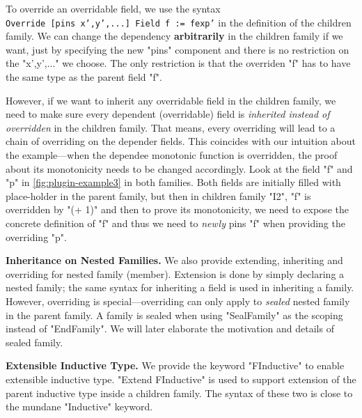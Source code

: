 To override an overridable field, we use the syntax \\ \texttt{Override [pins {x',y',...}] Field f := fexp'} in the definition of the children family. We can change the dependency \textbf{arbitrarily} in the children family if we want, just by specifying the new "pins" component and there is no restriction on the "x',y',..." we choose. The only restriction is that the overriden "f" has to have the same type as the parent field "f". 

However, if we want to inherit any overridable field in the children family, we need to make sure every dependent (overridable) field is \textit{inherited instead of overridden} in the children family. That means, every overriding will lead to a chain of overriding on the depender fields. This coincides with our intuition about the example---when the dependee monotonic function is overridden, the proof about its monotonicity needs to be changed accordingly. 
Look at the field "f" and "p" in \cref{fig:plugin-example3} in both families. Both fields are initially filled with place-holder in the parent family, but then in children family "I2", "f" is overridden by "(+ 1)" and then to prove its monotonicity, we need to expose the concrete definition of "f" and thus we need to \textit{newly} pins "f" when providing the overriding "p".





\textbf{Inheritance on Nested Families.} We also provide extending,
inheriting and overriding for nested family (member). Extension is done
by simply declaring a nested family; the same syntax for inheriting a
field is used in inheriting a family. However, overriding is
special---overriding can only apply to \textit{sealed} nested family in
the parent family. A family is sealed when using "SealFamily" as the
scoping instead of "EndFamily". We will later elaborate the motivation
and details of sealed family.


\textbf{Extensible Inductive Type.} We provide the keyword "FInductive"
to enable extensible inductive type. "Extend FInductive" is used to
support extension of the parent inductive type inside a children family.
The syntax of these two is close to the mundane "Inductive" keyword. 

